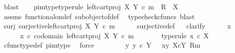 \begin{isabellebody}
\ blast\isanewline
\ \ \isamarkupfalse%
\ pi{}{\isacharunderscore}{\kern0pt}m{\isacharunderscore}{\kern0pt}type{\isacharbrackleft}{\kern0pt}type{\isacharunderscore}{\kern0pt}rule{\isacharbrackright}{\kern0pt}{\isacharcolon}{\kern0pt}\ {\isachardoublequoteopen}left{\isacharunderscore}{\kern0pt}cart{\isacharunderscore}{\kern0pt}proj\ X\ Y\ {\isasymcirc}\isactrlsub c\ m\ {\isacharcolon}{\kern0pt}\ R\ {\isasymrightarrow}\ X{\isachardoublequoteclose}\isanewline
\ \ \ \ \isamarkupfalse%
\ assms\ functional{\isacharunderscore}{\kern0pt}on{\isacharunderscore}{\kern0pt}def\ subobject{\isacharunderscore}{\kern0pt}of{\isacharunderscore}{\kern0pt}def{}\ \isamarkupfalse%
\ {\isacharparenleft}{\kern0pt}typecheck{\isacharunderscore}{\kern0pt}cfuncs{\isacharcomma}{\kern0pt}\ blast{\isacharparenright}{\kern0pt}\isanewline
\ \ \isamarkupfalse%
\ surj{\isacharcolon}{\kern0pt}\ {\isachardoublequoteopen}surjective{\isacharparenleft}{\kern0pt}left{\isacharunderscore}{\kern0pt}cart{\isacharunderscore}{\kern0pt}proj\ X\ Y\ {\isasymcirc}\isactrlsub c\ m{\isacharparenright}{\kern0pt}{\isachardoublequoteclose}\isanewline
\ \ \ \ \isamarkupfalse%
\ surjective{\isacharunderscore}{\kern0pt}def\isanewline
\ \ \isamarkupfalse%
{\isacharparenleft}{\kern0pt}clarify{\isacharparenright}{\kern0pt}\isanewline
\ \ \ \ \isamarkupfalse%
\ x\ \isanewline
\ \ \ \ \isamarkupfalse%
\ {\isachardoublequoteopen}x\ {\isasymin}\isactrlsub c\ codomain\ {\isacharparenleft}{\kern0pt}left{\isacharunderscore}{\kern0pt}cart{\isacharunderscore}{\kern0pt}proj\ X\ Y\ {\isasymcirc}\isactrlsub c\ m{\isacharparenright}{\kern0pt}{\isachardoublequoteclose}\isanewline
\ \ \ \ \isamarkupfalse%
\ \isamarkupfalse%
\ {\isacharbrackleft}{\kern0pt}type{\isacharunderscore}{\kern0pt}rule{\isacharbrackright}{\kern0pt}{\isacharcolon}{\kern0pt}\ {\isachardoublequoteopen}x\ {\isasymin}\isactrlsub c\ X{\isachardoublequoteclose}\isanewline
\ \ \ \ \ \ \isamarkupfalse%
\ cfunc{\isacharunderscore}{\kern0pt}type{\isacharunderscore}{\kern0pt}def\ pi{}{\isacharunderscore}{\kern0pt}m{\isacharunderscore}{\kern0pt}type\ \isamarkupfalse%
\ force\isanewline
\ \ \ \ \isamarkupfalse%
\ \isamarkupfalse%
\ {\isachardoublequoteopen}{\isasymexists}{\isacharbang}{\kern0pt}\ y{\isachardot}{\kern0pt}\ {\isacharparenleft}{\kern0pt}y\ {\isasymin}\isactrlsub c\ Y\ {\isasymand}\ \ {\isasymlangle}x{\isacharcomma}{\kern0pt}y{\isasymrangle}\ {\isasymin}\isactrlbsub X{\isasymtimes}\isactrlsub cY\isactrlesub \ {\isacharparenleft}{\kern0pt}R{\isacharcomma}{\kern0pt}m{\isacharparenright}{\kern0pt}{\isacharparenright}{\kern0pt}{\isachardoublequoteclose}\isanewline

\end{isabellebody}
